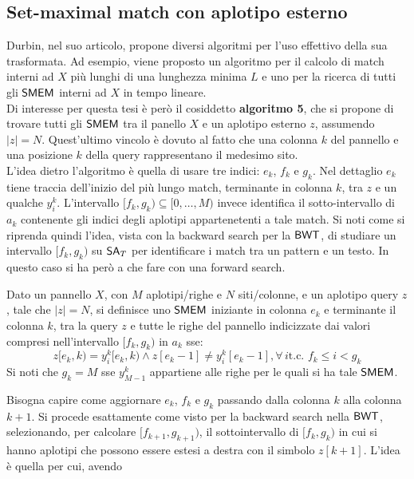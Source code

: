 \subsection{Set-maximal match con aplotipo esterno}
Durbin, nel suo articolo, propone diversi algoritmi per l'uso effettivo della
sua trasformata. Ad esempio, viene proposto un algoritmo per il calcolo
di match interni ad $X$ più lunghi di una lunghezza minima $L$ e uno per la
ricerca di tutti gli $\mbox{\rm {\sf SMEM}}$ interni ad $X$ in tempo lineare.\\
Di interesse per questa tesi è però il cosiddetto \textbf{algoritmo 5}, che
si propone di trovare tutti gli $\mbox{\rm {\sf SMEM}}$  tra il panello $X$ e un
aplotipo esterno $z$, assumendo $|z|=N$. Quest'ultimo vincolo è dovuto al fatto
che una colonna $k$ del
pannello e una posizione $k$ della query rappresentano il medesimo sito.\\ 
L'idea dietro l'algoritmo è quella di usare tre indici: $e_k$, $f_k$ e
$g_k$. Nel dettaglio $e_k$ tiene traccia dell'inizio del più lungo match,
terminante in colonna $k$, tra $z$ e un qualche $y_i^k$. L'intervallo
$[f_k,g_k)\subseteq[0,\ldots,M)$ invece identifica il sotto-intervallo di
$a_k$ contenente gli indici degli aplotipi appartenetenti a tale match. Si noti
come si riprenda quindi l'idea, vista con la backward search per la
$\mbox{\rm {\sf BWT}}$, di studiare un intervallo $[f_k,g_k)$ su $\mbox{\rm {\sf SA}}_T$ per identificare i
match tra un pattern e un testo. In questo caso si ha però a che fare con una
forward search.
\begin{definizione}
  Dato un pannello $X$, con $M$ aplotipi/righe e $N$ siti/colonne, e un aplotipo
  query $z$, tale che $|z|=N$, si definisce uno $\mbox{\rm {\sf SMEM}}$ iniziante in colonna
  $e_k$ e terminante il colonna 
  $k$, tra 
  la query $z$ e tutte le righe del pannello indicizzate dai valori compresi
  nell'intervallo $[f_k,g_k)$ in $a_k$ sse:
  \begin{equation}
    \label{eq:pbwtsmem}
    z[e_k,k)=y_i^k[e_k,k)\land z[e_k-1]\neq y_i^k[e_k-1], \forall\, i\mbox{
      t.c. }f_k\leq i < g_k
  \end{equation}
  Si noti che $g_k=M$ sse $y_{M-1}^k$ appartiene alle righe per le quali si ha
  tale $\mbox{\rm {\sf SMEM}}$.
\end{definizione}
Bisogna capire come aggiornare $e_k$, $f_k$ e $g_k$ passando dalla
colonna $k$ alla colonna $k+1$. Si procede esattamente come visto per la
backward search nella $\mbox{\rm {\sf BWT}}$, selezionando, per calcolare $[f_{k+1},g_{k+1})$, il
sottointervallo di $[f_k,g_k)$ in cui si hanno aplotipi che possono essere estesi
a destra con il simbolo $z[k+1]$. L'idea è quella per cui, avendo
